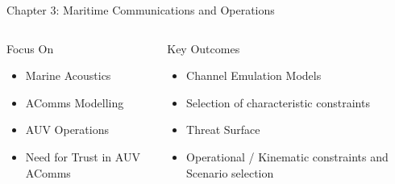 \documentclass[aspectratio=169]{beamer}
\begin{document}
\begin{frame}{Chapter 3: Maritime Communications and Operations}
      \begin{columns}
		\begin{column}{0.5\textwidth}
			\begin{block}{Focus On}
				\begin{itemize}
					\item Marine Acoustics
					\item AComms Modelling 
					\item AUV Operations
					\item Need for Trust in AUV AComms
				\end{itemize}
			\end{block}
		\end{column}
		\begin{column}{0.5\textwidth}
			\begin{exampleblock}{Key Outcomes}
				\begin{itemize}
					\item Channel Emulation Models
					\item Selection of characteristic constraints
					\item Threat Surface
					\item Operational / Kinematic constraints and Scenario selection
				\end{itemize}
			\end{exampleblock}
		\end{column}
      \end{columns}
      
\end{frame}
\end{document}
